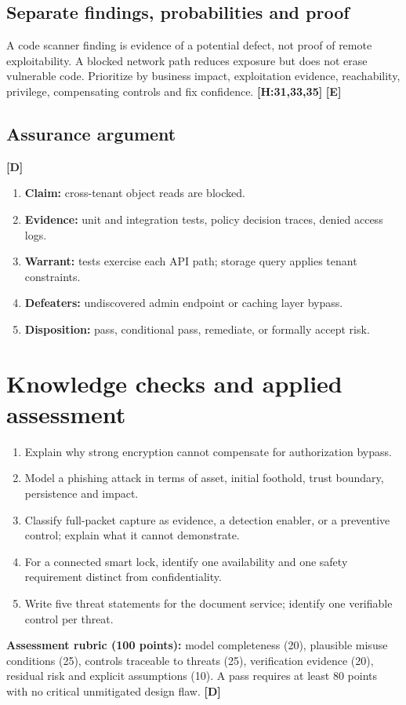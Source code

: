 \documentclass[10pt,letterpaper,oneside]{article}
\newcommand{\handbookref}[1]{\textsf{\color{accent}\textbf{[H:#1]}}}
\newcommand{\modernext}{\textsf{\color{muted}\textbf{[E]}}}
\newcommand{\designed}{\textsf{\color{accent}\textbf{[D]}}}
\begin{document}
\subsection{Separate findings, probabilities and proof}
A code scanner finding is evidence of a potential defect, not proof of remote exploitability. A blocked network path reduces exposure but does not erase vulnerable code. Prioritize by business impact, exploitation evidence, reachability, privilege, compensating controls and fix confidence. \handbookref{31,33,35} \modernext{}

\subsection{Assurance argument}\designed{}
\begin{enumerate}
\item \textbf{Claim:} cross-tenant object reads are blocked.
\item \textbf{Evidence:} unit and integration tests, policy decision traces, denied access logs.
\item \textbf{Warrant:} tests exercise each API path; storage query applies tenant constraints.
\item \textbf{Defeaters:} undiscovered admin endpoint or caching layer bypass.
\item \textbf{Disposition:} pass, conditional pass, remediate, or formally accept risk.
\end{enumerate}

\section{Knowledge checks and applied assessment}
\begin{enumerate}
\item Explain why strong encryption cannot compensate for authorization bypass.
\item Model a phishing attack in terms of asset, initial foothold, trust boundary, persistence and impact.
\item Classify full-packet capture as evidence, a detection enabler, or a preventive control; explain what it cannot demonstrate.
\item For a connected smart lock, identify one availability and one safety requirement distinct from confidentiality.
\item Write five threat statements for the document service; identify one verifiable control per threat.
\end{enumerate}
\begin{sourcebox}\textbf{Assessment rubric (100 points):} model completeness (20), plausible misuse conditions (25), controls traceable to threats (25), verification evidence (20), residual risk and explicit assumptions (10). A pass requires at least 80 points with no critical unmitigated design flaw. \designed{}\end{sourcebox}
\end{document}
